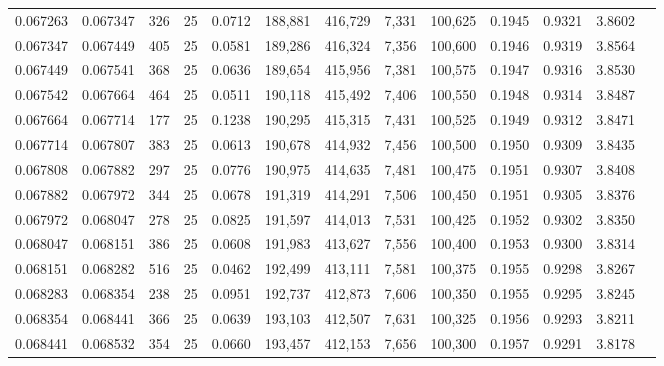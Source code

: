 \begin{tabular}{rrrrrrrrrrrrr}
0.067263 & 0.067347 &   326 &  25 &                                     0.0712 & 188,881 & 416,729 &   7,331 & 100,625 & 0.1945 & 0.9321 & 3.8602 \\
0.067347 & 0.067449 &   405 &  25 &                                     0.0581 & 189,286 & 416,324 &   7,356 & 100,600 & 0.1946 & 0.9319 & 3.8564 \\
0.067449 & 0.067541 &   368 &  25 &                                     0.0636 & 189,654 & 415,956 &   7,381 & 100,575 & 0.1947 & 0.9316 & 3.8530 \\
0.067542 & 0.067664 &   464 &  25 &                                     0.0511 & 190,118 & 415,492 &   7,406 & 100,550 & 0.1948 & 0.9314 & 3.8487 \\
0.067664 & 0.067714 &   177 &  25 &                                     0.1238 & 190,295 & 415,315 &   7,431 & 100,525 & 0.1949 & 0.9312 & 3.8471 \\
0.067714 & 0.067807 &   383 &  25 &                                     0.0613 & 190,678 & 414,932 &   7,456 & 100,500 & 0.1950 & 0.9309 & 3.8435 \\
0.067808 & 0.067882 &   297 &  25 &                                     0.0776 & 190,975 & 414,635 &   7,481 & 100,475 & 0.1951 & 0.9307 & 3.8408 \\
0.067882 & 0.067972 &   344 &  25 &                                     0.0678 & 191,319 & 414,291 &   7,506 & 100,450 & 0.1951 & 0.9305 & 3.8376 \\
0.067972 & 0.068047 &   278 &  25 &                                     0.0825 & 191,597 & 414,013 &   7,531 & 100,425 & 0.1952 & 0.9302 & 3.8350 \\
0.068047 & 0.068151 &   386 &  25 &                                     0.0608 & 191,983 & 413,627 &   7,556 & 100,400 & 0.1953 & 0.9300 & 3.8314 \\
0.068151 & 0.068282 &   516 &  25 &                                     0.0462 & 192,499 & 413,111 &   7,581 & 100,375 & 0.1955 & 0.9298 & 3.8267 \\
0.068283 & 0.068354 &   238 &  25 &                                     0.0951 & 192,737 & 412,873 &   7,606 & 100,350 & 0.1955 & 0.9295 & 3.8245 \\
0.068354 & 0.068441 &   366 &  25 &                                     0.0639 & 193,103 & 412,507 &   7,631 & 100,325 & 0.1956 & 0.9293 & 3.8211 \\
0.068441 & 0.068532 &   354 &  25 &                                     0.0660 & 193,457 & 412,153 &   7,656 & 100,300 & 0.1957 & 0.9291 & 3.8178 \\

\end{tabular}
